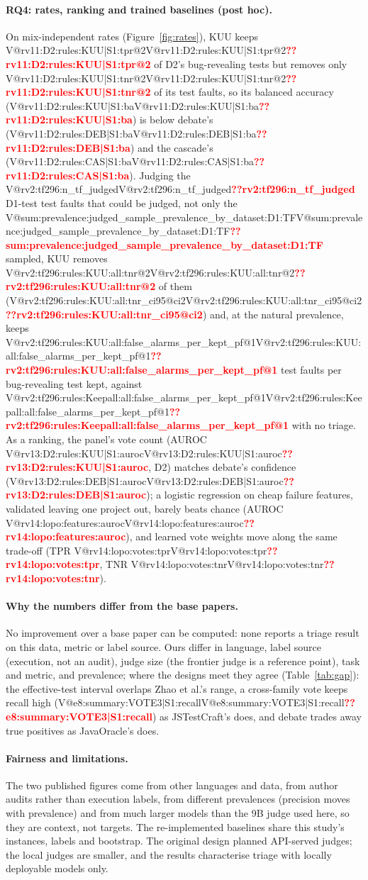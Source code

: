 \documentclass[pdflatex,iicol,sn-mathphys-num]{sn-jnl}
\makeatletter
\newcommand{\V}[1]{\ifcsname V@#1\endcsname\csname V@#1\endcsname\else\textbf{\textcolor{red}{??#1}}\fi}
\makeatother
\begin{document}
\begin{appendices}
\paragraph{RQ4: rates, ranking and trained baselines (post hoc).} On mix-independent rates (Figure~\ref{fig:rates}), KUU keeps \V{rv11:D2:rules:KUU|S1:tpr@2} of D2's bug-revealing tests but removes only \V{rv11:D2:rules:KUU|S1:tnr@2} of its test faults, so its balanced accuracy (\V{rv11:D2:rules:KUU|S1:ba}) is below debate's (\V{rv11:D2:rules:DEB|S1:ba}) and the cascade's (\V{rv11:D2:rules:CAS|S1:ba}). Judging the \V{rv2:tf296:n_tf_judged} D1-test test faults that could be judged, not only the \V{sum:prevalence:judged_sample_prevalence_by_dataset:D1:TF} sampled, KUU removes \V{rv2:tf296:rules:KUU:all:tnr@2} of them (\V{rv2:tf296:rules:KUU:all:tnr_ci95@ci2}) and, at the natural prevalence, keeps \V{rv2:tf296:rules:KUU:all:false_alarms_per_kept_pf@1} test faults per bug-revealing test kept, against \V{rv2:tf296:rules:Keepall:all:false_alarms_per_kept_pf@1} with no triage. As a ranking, the panel's vote count (AUROC \V{rv13:D2:rules:KUU|S1:auroc}, D2) matches debate's confidence (\V{rv13:D2:rules:DEB|S1:auroc}); a logistic regression on cheap failure features, validated leaving one project out, barely beats chance (AUROC \V{rv14:lopo:features:auroc}), and learned vote weights move along the same trade-off (TPR \V{rv14:lopo:votes:tpr}, TNR \V{rv14:lopo:votes:tnr}).

\paragraph{Why the numbers differ from the base papers.} No improvement over a base paper can be computed: none reports a triage result on this data, metric or label source. Ours differ in language, label source (execution, not an audit), judge size (the frontier judge is a reference point), task and metric, and prevalence; where the designs meet they agree (Table~\ref{tab:gap}): the effective-test interval overlaps Zhao et al.'s range, a cross-family vote keeps recall high (\V{e8:summary:VOTE3|S1:recall}) as JSTestCraft's does, and debate trades away true positives as JavaOracle's does.

\paragraph{Fairness and limitations.} The two published figures come from other languages and data, from author audits rather than execution labels, from different prevalences (precision moves with prevalence) and from much larger models than the 9B judge used here, so they are context, not targets. The re-implemented baselines share this study's instances, labels and bootstrap. The original design planned API-served judges; the local judges are smaller, and the results characterise triage with locally deployable models only.


\end{appendices}
\end{document}
